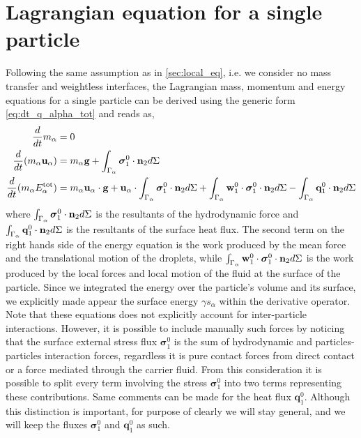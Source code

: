  \section{Lagrangian equation for a single particle}
\label{ap:particles_eq}
Following the same assumption as in \ref{sec:local_eq}, i.e. we consider no mass transfer and weightless interfaces, the Lagrangian  mass, momentum and energy equations for a single particle can be derived using the generic form \ref{eq:dt_q_alpha_tot} and reads as, 
\begin{align}
    \label{eq:dt_m_alpha}
    \frac{d}{d t} m_\alpha
    &= 
    0\\
    \label{eq:dt_p_alpha}
    \frac{d}{d t} (m_\alpha \textbf{u}_\alpha)
    &= 
    m_\alpha\textbf{g}
    +  \int_{\Gamma_\alpha} \bm{\sigma}_1^0 \cdot \textbf{n}_2 d\Sigma\\
    \label{eq:dt_E_alpha_tot}
    \frac{d}{d t} (m_\alpha E_\alpha^\text{tot})
    &= 
    m_\alpha \textbf{u}_\alpha \cdot \textbf{g}
    +\textbf{u}_\alpha \cdot \int_{\Gamma_\alpha} \bm{\sigma}_1^0 \cdot \textbf{n}_2 d\Sigma
    +\int_{\Gamma_\alpha} \textbf{w}_1^0 \cdot \bm{\sigma}_1^0 \cdot  \textbf{n}_2 d\Sigma 
    - \int_{\Gamma_\alpha} \textbf{q}_1^0 \cdot \textbf{n}_2 d\Sigma
\end{align}
where  $\int_{\Gamma_\alpha}   \bm{\sigma}_1^0 \cdot \textbf{n}_2  d\Sigma$ is the resultants of the hydrodynamic force and $\int_{\Gamma_\alpha}  \textbf{q}_1^0 \cdot \textbf{n}_2  d\Sigma$ is the resultants of the surface heat flux. 
The second term on the right hands side of the energy equation is the work produced by the mean force and the translational motion of the droplets, while $\int_{\Gamma_\alpha} \textbf{w}_1^0 \cdot \bm{\sigma}_1^0 \cdot  \textbf{n}_2 d\Sigma$ is the work produced by the local forces and local motion of the fluid at the surface of the particle.
Since we integrated the energy over the particle's volume and its surface, we explicitly made appear the surface energy $\gamma s_\alpha$ within the derivative operator. 
Note that these equations does not explicitly account for inter-particle interactions. 
However, it is possible to include manually such forces by noticing that the surface external stress flux $\bm{\sigma}_1^0$ is the sum of hydrodynamic and particles-particles interaction forces, regardless it is pure contact forces from direct contact or a force mediated through the carrier fluid.
From this consideration it is possible to split every term involving the stress $\bm{\sigma}_1^0$ into two terms representing these contributions. 
Same comments can be made for the heat flux $\textbf{q}_1^0$. 
Although this distinction is important, for purpose of clearly we will stay general, and we will keep the fluxes $\bm{\sigma}_1^0$ and $\textbf{q}_1^0$ as such. 

